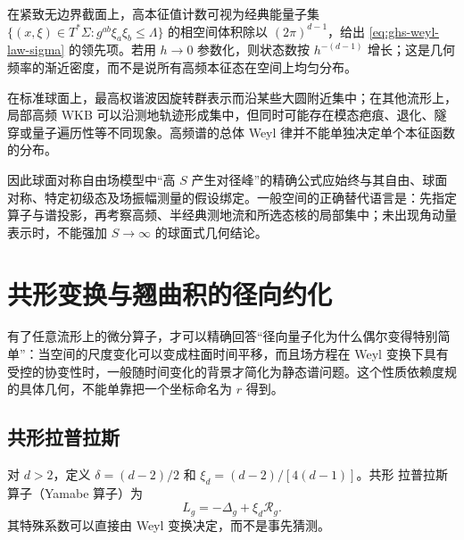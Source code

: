 在紧致无边界截面上，高本征值计数可视为经典能量子集
$\{(x,\xi)\in T^*\Sigma:g^{ab}\xi_a\xi_b\leq\Lambda\}$ 的相空间体积除以 $(2\pi)^{d-1}$，给出 \cref{eq:ghs-weyl-law-sigma} 的领先项。若用 $h\to0$ 参数化，则状态数按 $h^{-(d-1)}$ 增长；这是几何频率的渐近密度，而不是说所有高频本征态在空间上均匀分布。

在标准球面上，最高权谐波因旋转群表示而沿某些大圆附近集中；在其他流形上，局部高频 WKB 可以沿测地轨迹形成集中，但同时可能存在模态疤痕、退化、隧穿或量子遍历性等不同现象。高频谱的总体 Weyl 律并不能单独决定单个本征函数的分布。

因此球面对称自由场模型中“高 $S$ 产生对径峰”的精确公式应始终与其自由、球面对称、特定初级态及场振幅测量的假设绑定。一般空间的正确替代语言是：先指定算子与谱投影，再考察高频、半经典测地流和所选态核的局部集中；未出现角动量表示时，不能强加 $S\to\infty$ 的球面式几何结论。

\section{共形变换与翘曲积的径向约化}




有了任意流形上的微分算子，才可以精确回答“径向量子化为什么偶尔变得特别简单”：当空间的尺度变化可以变成柱面时间平移，而且场方程在 Weyl 变换下具有受控的协变性时，一般随时间变化的背景才简化为静态谱问题。这个性质依赖度规的具体几何，不能单靠把一个坐标命名为 $r$ 得到。

\subsection{共形拉普拉斯}
\label{sec:ghs-conformal-laplacian}

对 $d>2$，定义 $\delta=(d-2)/2$ 和 $\xi_d=(d-2)/[4(d-1)]$。共形 拉普拉斯算子（Yamabe 算子）为
\begin{equation}\label{eq:ghs-yamabe-definition}
 L_g=-\Delta_g+\xi_d\mathcal R_g.
\end{equation}
其特殊系数可以直接由 Weyl 变换决定，而不是事先猜测。


